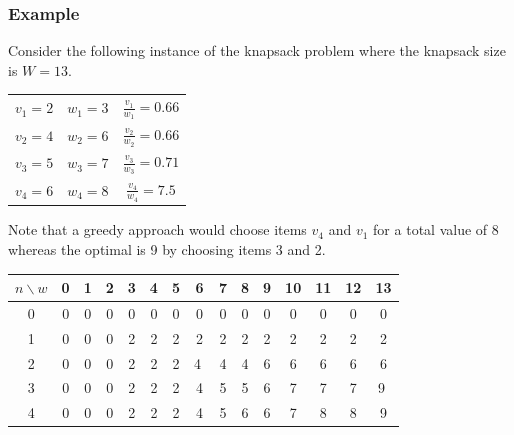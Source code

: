 \documentclass{beamer}
\begin{document}
\begin{frame}
  \frametitle{Example}
  Consider the following instance of the knapsack problem where the knapsack size is $W=13$.
  \begin{center}
    \begin{tabular}{|c|c|c|}
      \hline
      $v_1=2$ & $w_1=3$ & $\frac{v_1}{w_1}=0.66$\\
      $v_2=4$ & $w_2=6$ & $\frac{v_2}{w_2}=0.66$\\
      $v_3=5$ & $w_3=7$ & $\frac{v_3}{w_3}=0.71$\\
      $v_4=6$ & $w_4=8$ & $\frac{v_4}{w_4}=7.5$\\
      \hline
    \end{tabular}
  \end{center}
  Note that a greedy approach would choose items $v_4$ and $v_1$ for a total value of 8 
  whereas the optimal is 9 by choosing items 3 and 2.
\end{frame}
\begin{frame}
\begin{tabular}{c|cccccccccccccc}
$n\backslash w $&0 &1 &2 & 3 & 4 & 5 & 6 & 7 & 8 & 9 & 10 & 11 & 12 & 13\\
\hline  
0 &0 & 0 & 0 & 0 & 0 & 0 & 0 & 0 & 0 & 0 & 0 & 0 & 0 & 0  \\
1 &0 & 0 & 0 & 2 & 2 & 2 & 2 & 2 & 2 & 2 & 2 & 2 & 2 & 2  \\
2 &0 & 0 & 0 & 2 & 2 & 2 & \textcircled{4} & 4 & 4 & 6 & 6 & 6 & 6 & 6  \\
3 & 0 & 0 & 0 & 2 & 2 & 2 & 4 & 5 & 5 & 6 & 7 & 7 & 7 & \textcircled{9}  \\
4 &0 & 0 & 0 & 2 & 2 & 2 & 4 & 5 & 6 & 6 & 7 & 8 & 8 & 9  \\
\hline
\end{tabular}
\end{frame}
\end{document}
